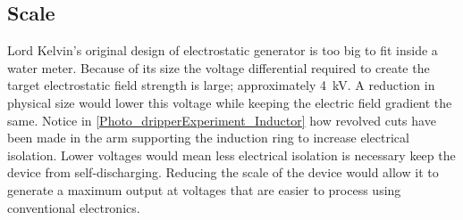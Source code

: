   \subsection*{Scale}

    Lord Kelvin's original design of electrostatic generator is too big to fit inside a water meter.
    Because of its size the voltage differential required to create the target electrostatic field strength is large; approximately \SI{4}{\kilo\volt}.
    A reduction in physical size would lower this voltage while keeping the electric field gradient the same.
    Notice in \cref{Photo_dripperExperiment_Inductor} how revolved cuts have been made in the arm supporting the induction ring to increase electrical isolation.
    Lower voltages would mean less electrical isolation is necessary keep the device from self-discharging.
    Reducing the scale of the device would allow it to generate a maximum output at voltages that are easier to process using conventional electronics.


%
%
%
